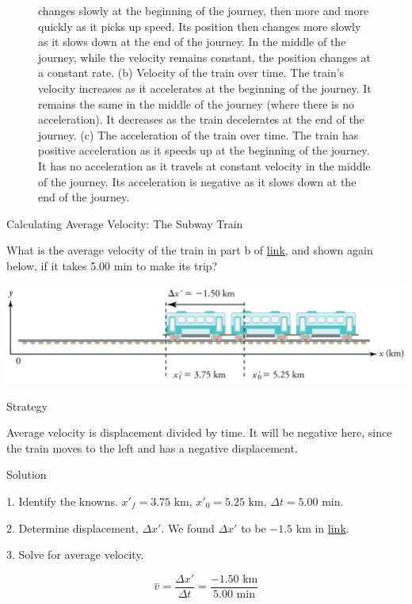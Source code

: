 \documentclass[
]{book}
\begin{document}
\begin{figure}
{{changes slowly at the beginning of the journey, then more and more
quickly as it picks up speed. Its position then changes more slowly as
it slows down at the end of the journey. In the middle of the journey,
while the velocity remains constant, the position changes at a constant
rate. (b) Velocity of the train over time. The train's velocity
increases as it accelerates at the beginning of the journey. It remains
the same in the middle of the journey (where there is no acceleration).
It decreases as the train decelerates at the end of the journey. (c) The
acceleration of the train over time. The train has positive acceleration
as it speeds up at the beginning of the journey. It has no acceleration
as it travels at constant velocity in the middle of the journey. Its
acceleration is negative as it slows down at the end of the
journey.}\label{import-auto-id2596938}
}
\end{figure}

\hypertarget{fs-id1348757}{}
Calculating Average Velocity: The Subway Train

What is the average velocity of the train in part b of
\protect\hyperlink{fs-id1744930}{link}, and shown again below, if
it takes 5.00 min to make its trip?

\includegraphics{images/Figure_02_03_04a.jpg}

{Strategy}

Average velocity is displacement divided by time. It will be negative
here, since the train moves to the left and has a negative displacement.

{Solution}

1. Identify the knowns. \({{x\prime}_{f} = 3}\text{.75\ km}\),
\({{x\prime}_{0} =}\text{5.25\ km}\), \({{\Delta t =}\text{5.00\ min}}{}\).

2. Determine displacement, \(\Delta x\prime\). We found \(\Delta x\prime\)
to be \({- \text{1.5\ km}}{}\) in
\protect\hyperlink{fs-id1744930}{link}.

3. Solve for average velocity.

\leavevmode{}%
\[{\overset{-}{v} = \frac{\Delta x\prime}{\Delta t}} = \frac{- \text{1.50\ km}}{\text{5.00\ min}}\]
\end{document}
